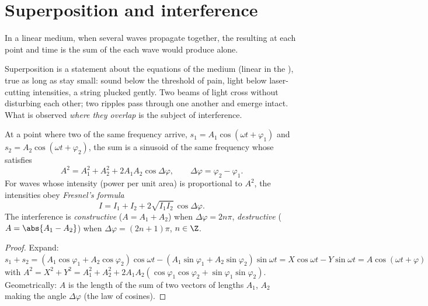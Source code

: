\section{Superposition and interference}

\begin{theorem}[Superposition]\label{thm:b1:wave-propagation:superposition}
In a linear medium, when several waves propagate together, the
resulting  at each point and time is the sum of the  each
wave would produce alone.
\end{theorem}
\admitted

\begin{remark}[Linearity]\label{rem:b1:wave-propagation:linearity}
Superposition is a statement about the equations of the medium (linear
in the ), true as long as  stay small: sound below the
threshold of pain, light below laser-cutting intensities, a string
plucked gently. Two beams of light cross without disturbing each other;
two ripples pass through one another and emerge intact. What is
observed \emph{where they overlap} is the subject of interference.
\end{remark}

\begin{theorem}\label{thm:b1:wave-propagation:fresnel}
At a point where two  of the same frequency arrive,
$s_1 = A_1\cos(\omega t + \varphi_1)$ and $s_2 = A_2\cos(\omega t + \varphi_2)$,
the sum is a sinusoid of the same frequency whose  satisfies
\[
A^2 = A_1^2 + A_2^2 + 2A_1A_2\cos\Delta\varphi,
\qquad \Delta\varphi = \varphi_2 - \varphi_1 .
\]
For waves whose intensity (power per unit area) is proportional to
$A^2$, the intensities obey \emph{Fresnel's formula}
\[
I = I_1 + I_2 + 2\sqrt{I_1 I_2}\,\cos\Delta\varphi .
\]
The interference is \emph{constructive} ($A = A_1 + A_2$) when
$\Delta\varphi = 2n\pi$, \emph{destructive} ($A = \abs{A_1 - A_2}$)
when $\Delta\varphi = (2n + 1)\pi$, $n \in \Z$.
\end{theorem}

\begin{proof}
Expand: $s_1 + s_2 = (A_1\cos\varphi_1 + A_2\cos\varphi_2)\cos\omega t -
(A_1\sin\varphi_1 + A_2\sin\varphi_2)\sin\omega t = X\cos\omega t -
Y\sin\omega t = A\cos(\omega t + \varphi)$ with $A^2 = X^2 + Y^2 =
A_1^2 + A_2^2 + 2A_1A_2(\cos\varphi_1\cos\varphi_2 + \sin\varphi_1\sin\varphi_2)$.
Geometrically: $A$ is the length of the sum of two vectors of lengths
$A_1$, $A_2$ making the angle $\Delta\varphi$ (the law of cosines).
\end{proof}

